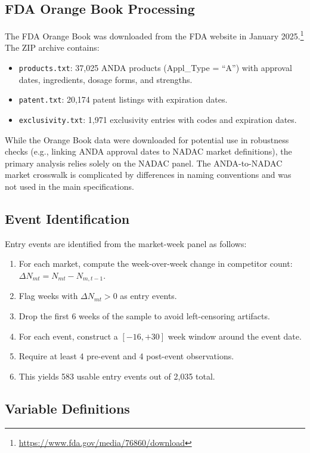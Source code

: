 \documentclass[12pt]{article}
\begin{document}
\subsection{FDA Orange Book Processing}

The FDA Orange Book was downloaded from the FDA website in January 2025.\footnote{\url{https://www.fda.gov/media/76860/download}} The ZIP archive contains:
\begin{itemize}
\item \texttt{products.txt}: 37,025 ANDA products (Appl\_Type = ``A'') with approval dates, ingredients, dosage forms, and strengths.
\item \texttt{patent.txt}: 20,174 patent listings with expiration dates.
\item \texttt{exclusivity.txt}: 1,971 exclusivity entries with codes and expiration dates.
\end{itemize}

While the Orange Book data were downloaded for potential use in robustness checks (e.g., linking ANDA approval dates to NADAC market definitions), the primary analysis relies solely on the NADAC panel. The ANDA-to-NADAC market crosswalk is complicated by differences in naming conventions and was not used in the main specifications.

\subsection{Event Identification}

Entry events are identified from the market-week panel as follows:
\begin{enumerate}
\item For each market, compute the week-over-week change in competitor count: $\Delta N_{mt} = N_{mt} - N_{m,t-1}$.
\item Flag weeks with $\Delta N_{mt} > 0$ as entry events.
\item Drop the first 6 weeks of the sample to avoid left-censoring artifacts.
\item For each event, construct a $[-16, +30]$ week window around the event date.
\item Require at least 4 pre-event and 4 post-event observations.
\item This yields 583 usable entry events out of 2,035 total.
\end{enumerate}

\subsection{Variable Definitions}
\end{document}
